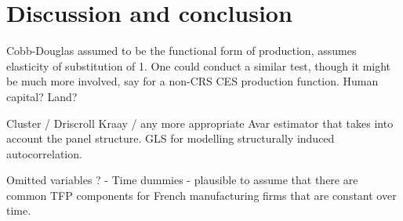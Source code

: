 \section{Discussion and conclusion}

Cobb-Douglas assumed to be the functional form of production, assumes elasticity of substitution of 1. One could conduct a similar test, though it might be much more involved, say for a non-CRS CES production function. Human capital? Land? 

Cluster / Driscroll Kraay / any more appropriate Avar estimator that takes into account the panel structure. GLS for modelling structurally induced autocorrelation.  

Omitted variables ? - Time dummies -\> plausible to assume that there are common TFP components for French manufacturing firms that are constant over time.